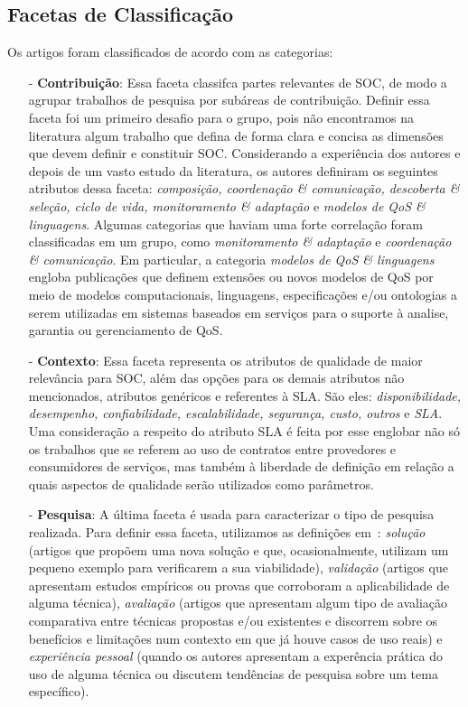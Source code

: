 \subsection{Facetas de Classificação}

Os artigos foram classificados de acordo com as categorias:
\begin{itemize}
\item[-] \textbf{Contribuição}: Essa faceta classifca partes relevantes de SOC, de modo a agrupar trabalhos de pesquisa por subáreas de contribuição. Definir essa faceta foi um primeiro desafio para o grupo, pois n\~{a}o encontramos na literatura algum trabalho que defina de forma clara e concisa as dimensões que devem definir e constituir SOC. Considerando a experi\^{e}ncia dos autores e depois de um vasto estudo da literatura, os autores definiram os seguintes atributos dessa faceta: \emph{composição, coordenação \& comunicação, descoberta \& seleção, ciclo de vida, monitoramento \& adaptação} e  \emph{modelos de QoS \& linguagens}. Algumas categorias que haviam uma forte correla\c{c}\~{a}o foram classificadas em um grupo, como  \emph{monitoramento \& adaptação} e \emph{coordenação \& comunicação}. Em particular, a categoria \emph{modelos de QoS \& linguagens} engloba publicações que definem extensões ou novos modelos de QoS por meio de modelos computacionais, linguagens, especificações e/ou ontologias a 
serem utilizadas em sistemas baseados em serviços para o suporte à analise, garantia ou gerenciamento de QoS.

\item[-] \textbf{Contexto}: Essa faceta representa os atributos de qualidade de maior relevância para SOC, além das opções para os demais atributos não mencionados, atributos genéricos e referentes à SLA. São eles: \emph{disponibilidade, desempenho, confiabilidade, escalabilidade, segurança, custo, outros} e \emph{SLA}. Uma consideração a respeito do atributo SLA é feita por esse englobar não só os trabalhos que se referem ao uso de contratos entre provedores e consumidores de serviços, mas também à liberdade de definição em relação a quais aspectos de qualidade serão utilizados como parâmetros.

\item[-] \textbf{Pesquisa}: A última faceta \'{e} usada para caracterizar o tipo de pesquisa realizada. Para definir essa faceta, utilizamos as defini\c{c}\~{o}es em~\cite{Wieringa:10.1007/s00766-005-0021-6}: 
\emph{solu\c c\~{a}o} (artigos que propõem uma nova solução e que, ocasionalmente, utilizam um pequeno exemplo para verificarem a sua viabilidade), \emph{validação} (artigos que apresentam 
estudos empíricos ou provas que corroboram a aplicabilidade de alguma t\'{e}cnica), \emph{avalia\c c\~{a}o} (artigos que apresentam 
algum tipo de avalia\c c\~{a}o comparativa entre t\'{e}cnicas propostas e/ou existentes e discorrem sobre os benefícios e limitações num contexto em que já houve casos de uso reais) e \emph{experiência pessoal} (quando os autores apresentam a exper\^{e}ncia pr\'{a}tica do uso de alguma t\'{e}cnica ou discutem tend\^{e}ncias de pesquisa sobre um tema espec\'{i}fico).
\end{itemize}

